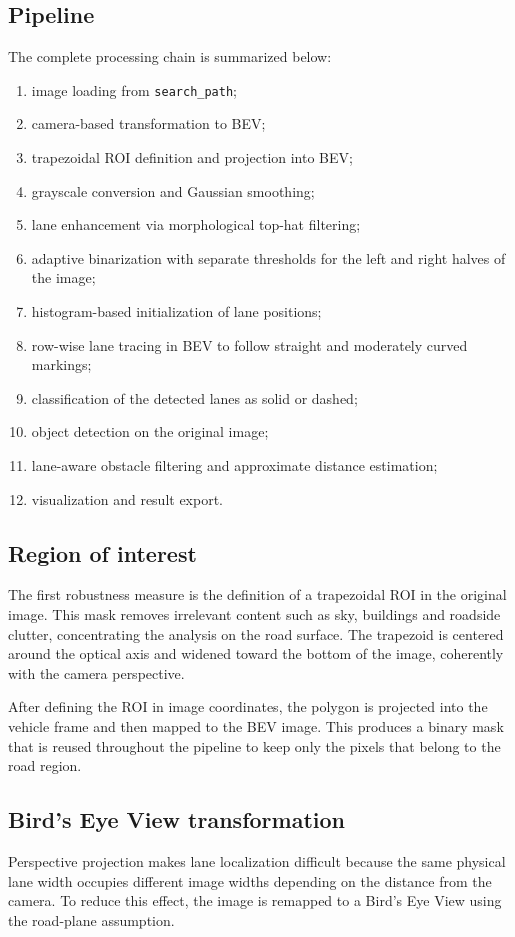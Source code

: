\documentclass[conference]{IEEEtran}
\begin{document}
\subsection{Pipeline}
The complete processing chain is summarized below:
\begin{enumerate}
    \item image loading from \texttt{search\_path};
    \item camera-based transformation to BEV;
    \item trapezoidal ROI definition and projection into BEV;
    \item grayscale conversion and Gaussian smoothing;
    \item lane enhancement via morphological top-hat filtering;
    \item adaptive binarization with separate thresholds for the left and right halves of the image;
    \item histogram-based initialization of lane positions;
    \item row-wise lane tracing in BEV to follow straight and moderately curved markings;
    \item classification of the detected lanes as solid or dashed;
    \item object detection on the original image;
    \item lane-aware obstacle filtering and approximate distance estimation;
    \item visualization and result export.
\end{enumerate}

\subsection{Region of interest}
The first robustness measure is the definition of a trapezoidal ROI in the original image. This mask removes irrelevant content such as sky, buildings and roadside clutter, concentrating the analysis on the road surface. The trapezoid is centered around the optical axis and widened toward the bottom of the image, coherently with the camera perspective.

After defining the ROI in image coordinates, the polygon is projected into the vehicle frame and then mapped to the BEV image. This produces a binary mask that is reused throughout the pipeline to keep only the pixels that belong to the road region.

\subsection{Bird's Eye View transformation}
Perspective projection makes lane localization difficult because the same physical lane width occupies different image widths depending on the distance from the camera. To reduce this effect, the image is remapped to a Bird's Eye View using the road-plane assumption.
\end{document}
